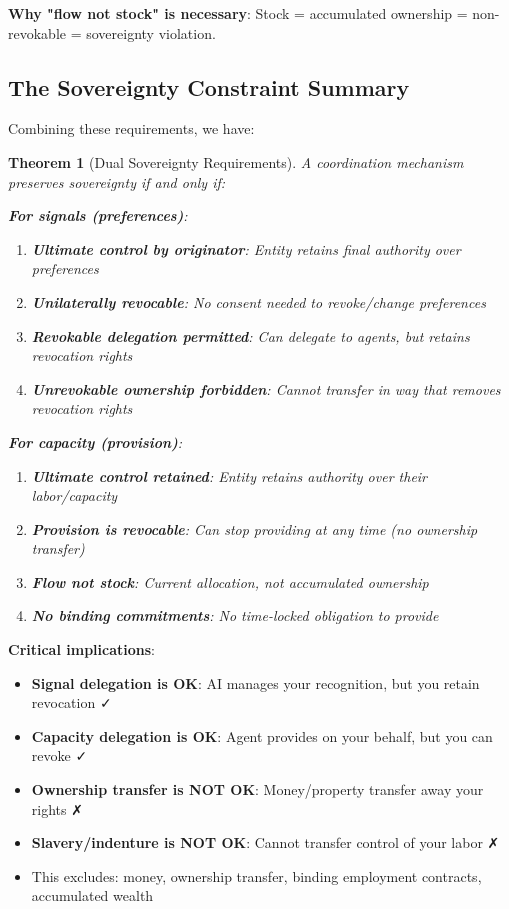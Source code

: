 \documentclass[11pt,a4paper]{article}
\newtheorem{theorem}{Theorem}[section]
\theoremstyle{definition}
\theoremstyle{remark}
\begin{document}
\textbf{Why "flow not stock" is necessary}: Stock = accumulated ownership = non-revokable = sovereignty violation.

\subsection{The Sovereignty Constraint Summary}

Combining these requirements, we have:

\begin{theorem}[Dual Sovereignty Requirements]
A coordination mechanism preserves sovereignty if and only if:

\textbf{For signals (preferences)}:
\begin{enumerate}
\item \textbf{Ultimate control by originator}: Entity retains final authority over preferences
\item \textbf{Unilaterally revocable}: No consent needed to revoke/change preferences
\item \textbf{Revokable delegation permitted}: Can delegate to agents, but retains revocation rights
\item \textbf{Unrevokable ownership forbidden}: Cannot transfer in way that removes revocation rights
\end{enumerate}

\textbf{For capacity (provision)}:
\begin{enumerate}
\item \textbf{Ultimate control retained}: Entity retains authority over their labor/capacity
\item \textbf{Provision is revocable}: Can stop providing at any time (no ownership transfer)
\item \textbf{Flow not stock}: Current allocation, not accumulated ownership
\item \textbf{No binding commitments}: No time-locked obligation to provide
\end{enumerate}
\end{theorem}

\textbf{Critical implications}:
\begin{itemize}
\item \textbf{Signal delegation is OK}: AI manages your recognition, but you retain revocation ✓
\item \textbf{Capacity delegation is OK}: Agent provides on your behalf, but you can revoke ✓
\item \textbf{Ownership transfer is NOT OK}: Money/property transfer away your rights ✗
\item \textbf{Slavery/indenture is NOT OK}: Cannot transfer control of your labor ✗
\item This excludes: money, ownership transfer, binding employment contracts, accumulated wealth
\end{itemize}
\end{document}

